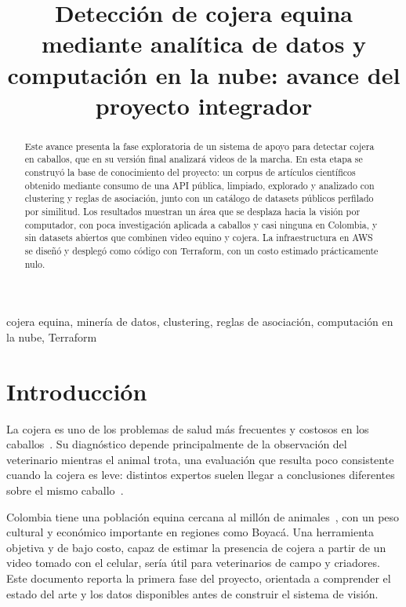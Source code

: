 \documentclass[conference,a4paper]{IEEEtran}
\begin{document}
\title{Detección de cojera equina mediante analítica de datos y computación en la nube: avance del proyecto integrador}

\author{
}

\maketitle

\begin{abstract}
Este avance presenta la fase exploratoria de un sistema de apoyo para detectar cojera en caballos, que en su versión final analizará videos de la marcha. En esta etapa se construyó la base de conocimiento del proyecto: un corpus de artículos científicos obtenido mediante consumo de una API pública, limpiado, explorado y analizado con clustering y reglas de asociación, junto con un catálogo de datasets públicos perfilado por similitud. Los resultados muestran un área que se desplaza hacia la visión por computador, con poca investigación aplicada a caballos y casi ninguna en Colombia, y sin datasets abiertos que combinen video equino y cojera. La infraestructura en AWS se diseñó y desplegó como código con Terraform, con un costo estimado prácticamente nulo.
\end{abstract}

\begin{IEEEkeywords}
cojera equina, minería de datos, clustering, reglas de asociación, computación en la nube, Terraform
\end{IEEEkeywords}

\section{Introducción}
La cojera es uno de los problemas de salud más frecuentes y costosos en los caballos~\cite{nehs2013,usda1998}. Su diagnóstico depende principalmente de la observación del veterinario mientras el animal trota, una evaluación que resulta poco consistente cuando la cojera es leve: distintos expertos suelen llegar a conclusiones diferentes sobre el mismo caballo~\cite{keegan2010,hammarberg2016}.

Colombia tiene una población equina cercana al millón de animales~\cite{agronegocios2025}, con un peso cultural y económico importante en regiones como Boyacá. Una herramienta objetiva y de bajo costo, capaz de estimar la presencia de cojera a partir de un video tomado con el celular, sería útil para veterinarios de campo y criadores. Este documento reporta la primera fase del proyecto, orientada a comprender el estado del arte y los datos disponibles antes de construir el sistema de visión.
\end{document}
